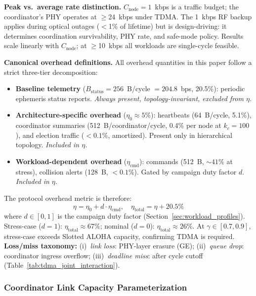 \documentclass[journal]{IEEEtran}
\begin{document}
\textbf{Peak vs.\ average rate distinction.} $C_{\text{node}} = 1$~kbps is a traffic budget; the coordinator's PHY operates at $\geq$24~kbps under TDMA. The 1~kbps RF backup applies during optical outages ($<$1\% of lifetime) but is design-driving: it determines coordination survivability, PHY rate, and safe-mode policy. Results scale linearly with $C_{\text{node}}$; at $\geq$10~kbps all workloads are single-cycle feasible.

\textbf{Canonical overhead definitions.} All overhead quantities in this paper follow a strict three-tier decomposition:
\begin{itemize}
    \item \textbf{Baseline telemetry} ($B_{\text{status}} = 256$~B/cycle $= 204.8$~bps, 20.5\%): periodic ephemeris status reports. \emph{Always present, topology-invariant, excluded from $\eta$.}
    \item \textbf{Architecture-specific overhead} ($\eta_0 \approx 5\%$): heartbeats (64~B/cycle, 5.1\%), coordinator summaries (512~B/coordinator/cycle, 0.4\% per node at $k_c = 100$), and election traffic ($< 0.1\%$, amortized). Present only in hierarchical topology. \emph{Included in $\eta$.}
    \item \textbf{Workload-dependent overhead} ($\eta_{\text{cmd}}$): commands (512~B, ${\sim}41\%$ at stress), collision alerts (128~B, $< 0.1\%$). Gated by campaign duty factor $d$. \emph{Included in $\eta$.}
\end{itemize}
\noindent The protocol overhead metric is therefore:
\begin{equation}
    \eta = \eta_0 + d \cdot \eta_{\text{cmd}}, \quad \eta_{\text{total}} = \eta + 20.5\%
    \label{eq:eta_canonical}
\end{equation}
\noindent where $d \in [0,1]$ is the campaign duty factor (Section~\ref{sec:workload_profiles}). Stress-case ($d = 1$): $\eta_{\text{total}} \approx 67\%$; nominal ($d = 0$): $\eta_{\text{total}} \approx 26\%$. At $\gamma \in [0.7, 0.9]$, stress-case exceeds Slotted ALOHA capacity, confirming TDMA is required. \textbf{Loss/miss taxonomy:} (i)~\emph{link loss}: PHY-layer erasure (GE); (ii)~\emph{queue drop}: coordinator ingress overflow; (iii)~\emph{deadline miss}: after cycle cutoff (Table~\ref{tab:tdma_joint_interaction}).

\subsubsection{Coordinator Link Capacity Parameterization}
\end{document}
